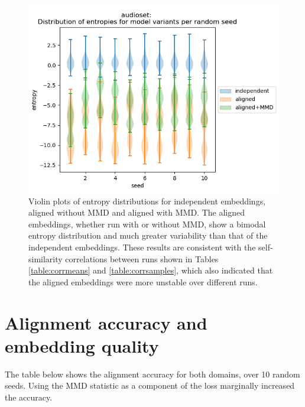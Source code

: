 \begin{figure}[H]
\label{fig:entropyviolinaudio}
\centering
\includegraphics[width=\textwidth]{images/results/audioset_entropies_violin.png}
\caption{Violin plots of entropy distributions for independent embeddings, aligned without MMD and aligned with MMD. The aligned embeddings, whether run with or without MMD, show a bimodal entropy distribution and much greater variability than that of the independent embeddings.  These results are consistent with the self-similarity correlations between runs shown in Tables \ref{table:corrmeans} and \ref{table:corrsamples}, which also indicated that the aligned embeddings were more unstable over different runs. }
\end{figure}

\section{Alignment accuracy and embedding quality}

The table below shows the alignment accuracy for both domains, over 10 random seeds. Using the MMD statistic as a component of the loss marginally increased the accuracy. 

